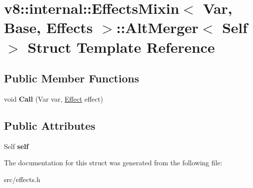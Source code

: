 \hypertarget{structv8_1_1internal_1_1_effects_mixin_1_1_alt_merger}{}\section{v8\+:\+:internal\+:\+:Effects\+Mixin$<$ Var, Base, Effects $>$\+:\+:Alt\+Merger$<$ Self $>$ Struct Template Reference}
\label{structv8_1_1internal_1_1_effects_mixin_1_1_alt_merger}
\subsection*{Public Member Functions}
\begin{DoxyCompactItemize}
\item 
\hypertarget{structv8_1_1internal_1_1_effects_mixin_1_1_alt_merger_af4a6516fe49c9b9287f1618f37d357b3}{}void {\bfseries Call} (Var var, \hyperlink{structv8_1_1internal_1_1_effect}{Effect} effect)\label{structv8_1_1internal_1_1_effects_mixin_1_1_alt_merger_af4a6516fe49c9b9287f1618f37d357b3}

\end{DoxyCompactItemize}
\subsection*{Public Attributes}
\begin{DoxyCompactItemize}
\item 
\hypertarget{structv8_1_1internal_1_1_effects_mixin_1_1_alt_merger_a89a5575969d2cbfab82bd8726165e2ac}{}Self {\bfseries self}\label{structv8_1_1internal_1_1_effects_mixin_1_1_alt_merger_a89a5575969d2cbfab82bd8726165e2ac}

\end{DoxyCompactItemize}


The documentation for this struct was generated from the following file\+:\begin{DoxyCompactItemize}
\item 
src/effects.\+h\end{DoxyCompactItemize}
